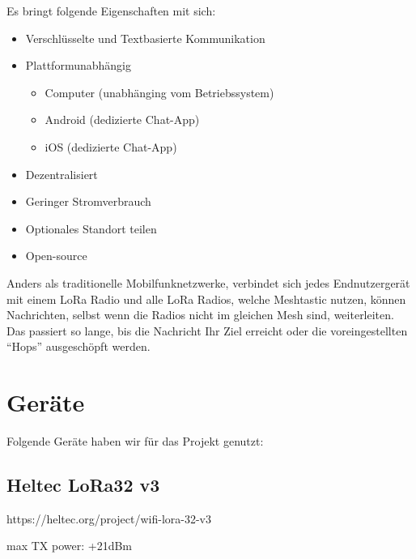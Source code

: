 \documentclass[12pt,a4paper]{article}
\begin{document}
Es bringt folgende Eigenschaften mit sich:
\begin{itemize}
	\item Verschlüsselte und Textbasierte Kommunikation
	\item Plattformunabhängig
	\begin{itemize}
		\item Computer (unabhänging vom Betriebssystem)
		\item Android (dedizierte Chat-App)
		\item iOS (dedizierte Chat-App)
	\end{itemize}
	\item Dezentralisiert
	\item Geringer Stromverbrauch
	\item Optionales Standort teilen
	\item Open-source
\end{itemize}

Anders als traditionelle Mobilfunknetzwerke, verbindet sich jedes Endnutzergerät mit einem LoRa Radio und alle LoRa Radios, welche Meshtastic nutzen, können Nachrichten, selbst wenn die Radios nicht im gleichen Mesh sind, weiterleiten. Das passiert so lange, bis die Nachricht Ihr Ziel erreicht oder die voreingestellten “Hops” ausgeschöpft werden.

\section{Geräte}

Folgende Geräte haben wir für das Projekt genutzt:

\subsection{Heltec LoRa32 v3}

https://heltec.org/project/wifi-lora-32-v3

max TX power: +21dBm
\end{document}
